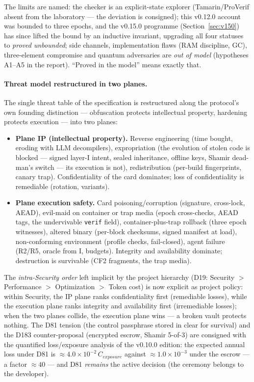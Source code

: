 \documentclass[11pt,a4paper]{article}
\newcommand{\code}[1]{\texttt{\small #1}}
\begin{document}
The limits are named: the checker is an explicit-state explorer
(Tamarin/ProVerif absent from the laboratory --- the deviation is
consigned); this v0.12.0 account was bounded to three epochs, and
the v0.15.0 programme (Section~\ref{sec:v150}) has since lifted the
bound by an inductive invariant, upgrading all four statuses to
\emph{proved unbounded}; side channels, implementation flaws (RAM
discipline, GC),
three-element compromise and quantum adversaries are \emph{out of
model} (hypotheses A1--A5 in the report). ``Proved in the model'' means
exactly that.

\paragraph{Threat model restructured in two planes.} The single threat
table of the specification is restructured along the protocol's own
founding distinction --- obfuscation protects intellectual property,
hardening protects execution --- into two planes:

\begin{itemize}
\item \textbf{Plane IP (intellectual property).} Reverse engineering
(time bought, eroding with LLM decompilers), expropriation (the
evolution of stolen code is blocked --- signed layer-I intent, sealed
inheritance, offline keys, Shamir dead-man's switch --- its execution
is not), redistribution (per-build fingerprints, canary trap).
Confidentiality of the card dominates; loss of confidentiality is
remediable (rotation, variants).
\item \textbf{Plane execution safety.} Card poisoning/corruption
(signature, cross-lock, AEAD), evil-maid on container or trap media
(epoch cross-checks, AEAD tags, the undervivable \code{verif} field),
container-plus-trap rollback (three epoch witnesses), altered binary
(per-block checksums, signed manifest at load), non-conforming
environment (profile checks, fail-closed), agent failure (R2/R5,
oracle from I, budgets). Integrity and availability dominate;
destruction is survivable (CF2 fragments, the trap media).
\end{itemize}

The \emph{intra-Security order} left implicit by the project hierarchy
(D19: Security $>$ Performance $>$ Optimization $>$ Token cost) is now
explicit as project policy: within Security, the IP plane ranks
confidentiality first (remediable losses), while the execution plane
ranks integrity and availability first (irremediable losses); when the
two planes collide, the execution plane wins --- a broken vault protects
nothing. The D81 tension (the control passphrase stored in clear for
survival) and the D183 counter-proposal (encrypted escrow, Shamir
5-of-3) are consigned with the quantified loss/exposure analysis of the
v0.10.0 edition: the expected annual loss under D81 is
$\approx 4.0 \times 10^{-2}\,C_{exposure}$ against
$\approx 1.0 \times 10^{-3}$ under the escrow --- a factor $\approx 40$
--- and D81 \emph{remains} the active decision (the ceremony belongs to
the developer).
\end{document}
